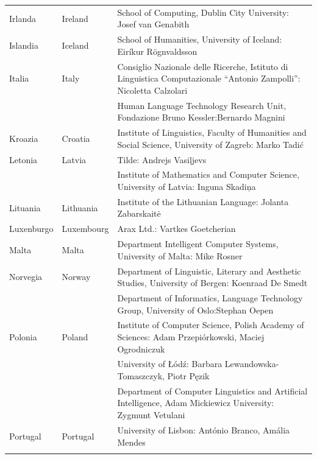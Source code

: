 \begin{longtable}{@{}llp{113mm}@{}}
  Irlanda & \textcolor{grey1}{Ireland} & School of Computing, Dublin City University: Josef van Genabith\\ \addlinespace
  Islandia & \textcolor{grey1}{Iceland} & School of Humanities, University of Iceland: Eiríkur Rögnvaldsson\\ \addlinespace
  Italia & \textcolor{grey1}{Italy} & Consiglio Nazionale delle Ricerche, Istituto di Linguistica Computazionale “Antonio Zampolli”: Nicoletta Calzolari\\ \addlinespace
  & & Human Language Technology Research Unit, Fondazione Bruno Kessler:\newline Bernardo Magnini\\ \addlinespace 
  Kroazia & \textcolor{grey1}{Croatia} & Institute of Linguistics, Faculty of Humanities and Social Science, University of Zagreb: Marko Tadić \\ \addlinespace
  Letonia & \textcolor{grey1}{Latvia} & Tilde: Andrejs Vasiļjevs\\ \addlinespace 
  & & Institute of Mathematics and Computer Science, University of Latvia: Inguna Skadiņa\\ \addlinespace
  Lituania & \textcolor{grey1}{Lithuania} & Institute of the Lithuanian Language: Jolanta Zabarskaitė\\ \addlinespace
  Luxenburgo & \textcolor{grey1}{Luxembourg} & Arax Ltd.: Vartkes Goetcherian\\ \addlinespace
  Malta & \textcolor{grey1}{Malta} & Department Intelligent Computer Systems, University of Malta: Mike Rosner\\ \addlinespace
  Norvegia & \textcolor{grey1}{Norway} & Department of Linguistic, Literary and Aesthetic Studies, University of Bergen: Koenraad De Smedt\\ \addlinespace 
  & & Department of Informatics, Language Technology Group, University of Oslo:\newline Stephan Oepen \\ \addlinespace
  Polonia & \textcolor{grey1}{Poland} & Institute of Computer Science, Polish Academy of Sciences: Adam Przepiórkowski, Maciej Ogrodniczuk \\ \addlinespace
  & & University of Łódź: Barbara Lewandowska-Tomaszczyk, Piotr Pęzik\\ \addlinespace
  & & Department of Computer Linguistics and Artificial Intelligence, Adam Mickiewicz University: Zygmunt Vetulani \\ \addlinespace
  Portugal & \textcolor{grey1}{Portugal} & University of Lisbon: António Branco, Amália Mendes \\ \addlinespace

\end{longtable}
